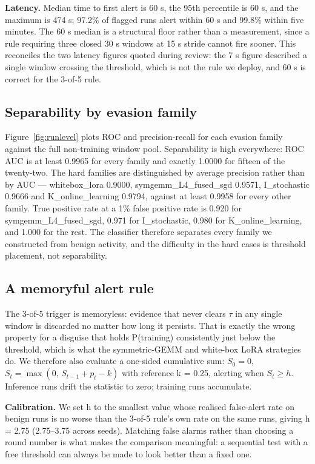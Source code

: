 \textbf{Latency.} Median time to first alert is 60 s, the 95th percentile is 60 s, and the maximum is 474 s; 97.2\% of flagged runs alert within 60 s and 99.8\% within five minutes. The 60 s median is a structural floor rather than a measurement, since a rule requiring three closed 30 s windows at 15 s stride cannot fire sooner. This reconciles the two latency figures quoted during review: the 7 s figure described a single window crossing the threshold, which is not the rule we deploy, and 60 s is correct for the 3-of-5 rule.

\subsection{Separability by evasion family}

Figure~\ref{fig:runlevel} plots ROC and precision-recall for each evasion family against the full non-training window pool. Separability is high everywhere: ROC AUC is at least 0.9965 for every family and exactly 1.0000 for fifteen of the twenty-two. The hard families are distinguished by average precision rather than by AUC --- whitebox\_lora 0.9000, symgemm\_L4\_fused\_sgd 0.9571, I\_stochastic 0.9666 and K\_online\_learning 0.9794, against at least 0.9958 for every other family. True positive rate at a 1\% false positive rate is 0.920 for symgemm\_L4\_fused\_sgd, 0.971 for I\_stochastic, 0.980 for K\_online\_learning, and 1.000 for the rest. The classifier therefore separates every family we constructed from benign activity, and the difficulty in the hard cases is threshold placement, not separability.

\subsection{A memoryful alert rule}

The 3-of-5 trigger is memoryless: evidence that never clears $\tau$ in any single window is discarded no matter how long it persists. That is exactly the wrong property for a disguise that holds P(training) consistently just below the threshold, which is what the symmetric-GEMM and white-box LoRA strategies do. We therefore also evaluate a one-sided cumulative sum: $S_0 = 0$, $S_t = \max(0,\, S_{t-1} + p_t - k)$ with reference k = 0.25, alerting when $S_t \geq h$. Inference runs drift the statistic to zero; training runs accumulate.

\textbf{Calibration.} We set h to the smallest value whose realised false-alert rate on benign runs is no worse than the 3-of-5 rule's own rate on the same runs, giving h = 2.75 (2.75--3.75 across seeds). Matching false alarms rather than choosing a round number is what makes the comparison meaningful: a sequential test with a free threshold can always be made to look better than a fixed one.

